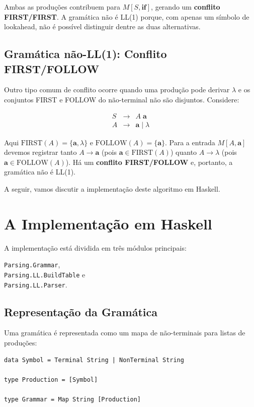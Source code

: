 Ambas as produções contribuem para \(M[S, \mathbf{if}]\), gerando um
\textbf{conflito FIRST/FIRST}. A gramática não é LL(1) porque, com
apenas um símbolo de lookahead, não é possível distinguir dentre as
duas alternativas.

\subsection{Gramática não-LL(1): Conflito FIRST/FOLLOW}

Outro tipo comum de conflito ocorre quando uma produção pode derivar
\(\lambda\) e os conjuntos FIRST e FOLLOW do não-terminal não são
disjuntos. Considere:

\[
\begin{array}{lcl}
S & \to & A\; \mathbf{a} \\
A & \to & \mathbf{a} \mid \lambda
\end{array}
\]

Aqui \(\mathrm{FIRST}(A) = \{\mathbf{a}, \lambda\}\) e
\(\mathrm{FOLLOW}(A) = \{\mathbf{a}\}\). Para a entrada \(M[A,
\mathbf{a}]\) devemos registrar tanto \(A \to \mathbf{a}\) (pois
\(\mathbf{a} \in \mathrm{FIRST}(A)\)) quanto \(A \to \lambda\) (pois
\(\mathbf{a} \in \mathrm{FOLLOW}(A)\)). Há um \textbf{conflito
FIRST/FOLLOW} e, portanto, a gramática não é LL(1).

A seguir, vamos discutir a implementação deste algoritmo em Haskell.

\section{A Implementação em Haskell}

A implementação está dividida em três módulos principais:
\begin{flushleft}
\verb|Parsing.Grammar|,\\
\verb|Parsing.LL.BuildTable| e\\
\verb|Parsing.LL.Parser|.
\end{flushleft}

\subsection{Representação da Gramática}

Uma gramática é representada como um mapa de não-terminais para
listas de produções:

\begin{verbatim}
data Symbol = Terminal String | NonTerminal String

type Production = [Symbol]

type Grammar = Map String [Production]
\end{verbatim}

